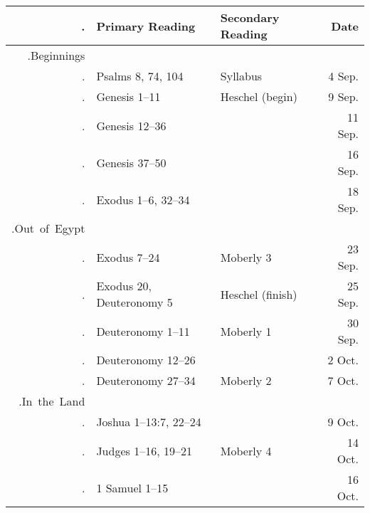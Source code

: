 \documentclass[titlepage]{article}
\begin{document}
\begin{table}[htb]
  \centering
  \begin{tabular}{>{\sessioncount.}r@{ }llr}
    \toprule
    \sessionskip{\textbf{\S}.}&\textbf{Primary Reading}&\textbf{Secondary Reading}&\textbf{Date}\\
    \midrule

    \unit{Beginnings} \\

          & Psalms 8, 74, 104               & Syllabus         &  4 Sep.     \\
          
          & Genesis 1--11                   & Heschel (begin)  &  9 Sep.     \\
          & Genesis 12--36                  &                  & 11 Sep.     \\
          
          & Genesis 37--50                  &                  & 16 Sep.     \\
          & Exodus 1--6, 32--34             &                  & 18 Sep.     \\ [1ex]

    \unit{Out of Egypt} \\
          
          & Exodus 7--24                    & Moberly 3        & 23 Sep.     \\
          & Exodus 20, Deuteronomy 5        & Heschel (finish) & 25 Sep.     \\
          
          & Deuteronomy 1--11               & Moberly 1        & 30 Sep.     \\
          & Deuteronomy 12--26              &                  &  2 Oct.     \\
          
          & Deuteronomy 27--34              & Moberly 2        &  7 Oct.     \\ [1ex]

    \unit{In the Land} \\

          & Joshua 1--13:7, 22--24          &                  &  9 Oct.     \\
          
          & Judges 1--16, 19--21            & Moberly 4        & 14 Oct.     \\
          & 1 Samuel 1--15                  &                  & 16 Oct.     \\
          

\end{tabular}
\end{table}
\end{document}
